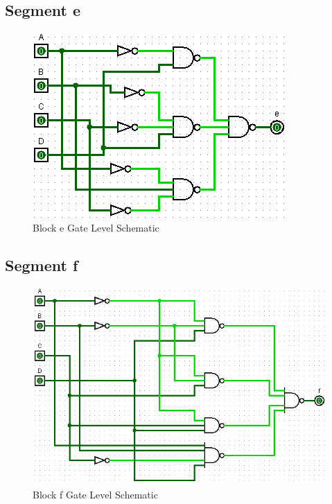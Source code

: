 \documentclass[12pt]{article}
\begin{document}
\subsection{Segment e}
\begin{figure}[H]
	\centering
	\label{fig:eBlockGates}
	\includegraphics[width=0.65\linewidth, keepaspectratio]{e_logicCkt}
	\caption{Block e Gate Level Schematic}
\end{figure}

\subsection{Segment f}
\begin{figure}[H]
	\centering
	\label{fig:fBlockGates}
	\includegraphics[width=0.65\linewidth, keepaspectratio]{f_logicCkt}
	\caption{Block f Gate Level Schematic}
\end{figure}

\end{document}
